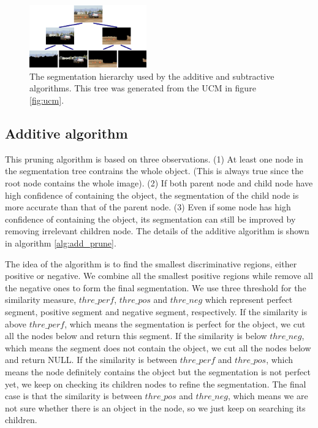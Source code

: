 \documentclass[10pt,twocolumn,letterpaper]{article}
\begin{document}
\begin{figure}
\centering
\includegraphics[width=0.45\textwidth]{figures/tree_additive.eps}
\caption{The segmentation hierarchy used by the additive
and subtractive algorithms.  This tree was generated from the UCM
in figure \ref{fig:ucm}.}
\label{fig:tree}
\end{figure}

\subsection{Additive algorithm}
\label{ssec:additive}

This pruning algorithm is based on three observations. (1) At least
one node in the segmentation tree contrains the whole object. (This
is always true since the root node contains the whole image). (2) If
both parent node and child node have high confidence of containing
the object, the segmentation of the child node is more accurate than
that of the parent node. (3) Even if some node has high confidence
of containing the object, its segmentation can still be improved by
removing irrelevant children node. The details of the additive
algorithm is shown in algorithm \ref{alg:add_prune}.

The idea of the algorithm is to find the smallest discriminative
regions, either positive or negative. We combine all the smallest
positive regions while remove all the negative ones to form the
final segmentation. We use three threshold for the similarity
measure, $thre\_perf$, $thre\_pos$ and $thre\_neg$ which represent
perfect segment, positive segment and negative segment,
respectively. If the similarity is above $thre\_perf$, which means
the segmentation is perfect for the object, we cut all the nodes
below and return this segment. If the similarity is below
$thre\_neg$, which means the segment does not contain the object, we
cut all the nodes below and return NULL. If the similarity is
between $thre\_perf$ and $thre\_pos$, which means the node
definitely contains the object but the segmentation is not perfect
yet, we keep on checking its children nodes to refine the
segmentation. The final case is that the similarity is between
$thre\_pos$ and $thre\_neg$, which means we are not sure whether
there is an object in the node, so we just keep on searching its
children.
\end{document}
